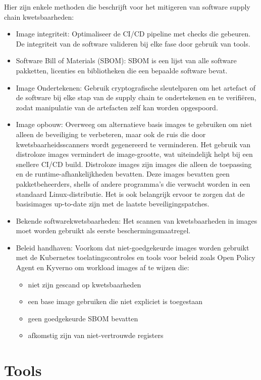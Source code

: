 Hier zijn enkele methoden die \textcite{OWASP-2023} beschrijft voor het mitigeren van software supply chain kwetsbaarheden:
\begin{itemize}
    \item Image integriteit: Optimaliseer de CI/CD pipeline met checks die gebeuren. De integriteit van de software valideren bij elke fase door gebruik van tools.
    \item Software Bill of Materials (SBOM): SBOM is een lijst van alle software pakketten, licenties en bibliotheken die een bepaalde software bevat.
    \item Image Ondertekenen: Gebruik cryptografische sleutelparen om het artefact of de software bij elke stap van de supply chain te ondertekenen en te verifiëren, zodat manipulatie van de artefacten zelf kan worden opgespoord.
    \item Image opbouw: Overweeg om alternatieve basis images te gebruiken om niet alleen de beveiliging te verbeteren, maar ook de ruis die door kwetsbaarheidsscanners wordt gegenereerd te verminderen. Het gebruik van distroloze images vermindert de image-grootte, wat uiteindelijk helpt bij een snellere CI/CD build. Distroloze images zijn images die alleen de toepassing en de runtime-afhankelijkheden bevatten. Deze images bevatten geen pakketbeheerders, shells of andere programma's die verwacht worden in een standaard Linux-distributie. Het is ook belangrijk ervoor te zorgen dat de basisimages up-to-date zijn met de laatste beveiligingspatches. 
    \item Bekende softwarekwetsbaarheden: Het scannen van kwetsbaarheden in images moet worden gebruikt als eerste beschermingsmaatregel.
    \item Beleid handhaven: Voorkom dat niet-goedgekeurde images worden gebruikt met de Kubernetes toelatingscontroles en tools voor beleid zoals Open Policy Agent en Kyverno om workload images af te wijzen die:
    \begin{itemize}
        \item niet zijn gescand op kwetsbaarheden
        \item een base image gebruiken die niet expliciet is toegestaan
        \item geen goedgekeurde SBOM bevatten
        \item afkomstig zijn van niet-vertrouwde registers
    \end{itemize}   
\end{itemize}


\section{Tools}

